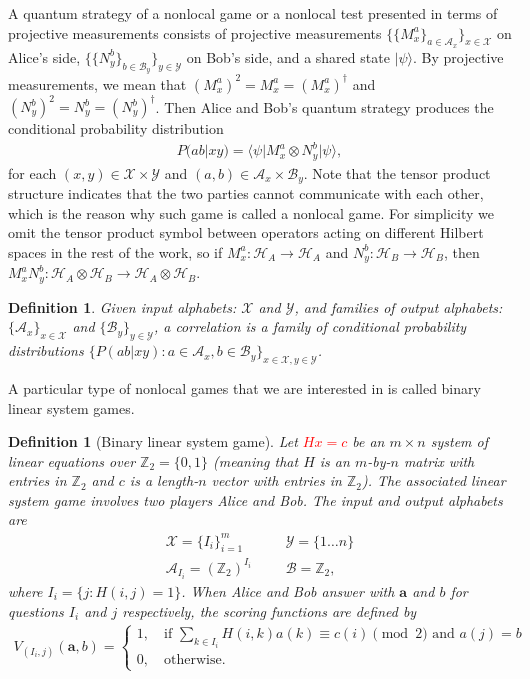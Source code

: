 \documentclass[11pt,letterpaper]{article}
\newcommand{\ket}[1]{|#1\rangle}
\newcommand{\bra}[1]{\langle#1|}
\newcommand{\x}{\otimes}
\newcommand{\Z}{\mathbb{Z}}
\newcommand{\calH}{\mathcal{H}}
\newcommand{\calX}{\mathcal{X}}
\newcommand{\calY}{\mathcal{Y}}
\newcommand{\calA}{\mathcal{A}}
\newcommand{\calB}{\mathcal{B}}
\newcommand{\1}{\mathbb{1}}
\newcommand{\ba}{\pmb{a}}
\newcommand{\pr}[2]{P(#1|#2)}
\newcommand{\hf}[1]{\textcolor{red}{#1}}
\newtheorem{definition}[theorem]{Definition}
\theoremstyle{definition}
\begin{document}
A quantum strategy of a nonlocal game or a nonlocal test presented in terms of projective measurements
consists of projective measurements $\{\{M_x^a\}_{a \in \calA_x} \}_{x \in \calX}$ on Alice's side, 
$\{\{N_y^b\}_{b \in \calB_y} \}_{y \in \calY}$ on Bob's side, and a shared state $\ket{\psi}$. 
By projective measurements, we mean that  
$(M_x^a)^2 = M_x^a = (M_x^a)^\dagger$ and $(N_y^b)^2 = N_y^b = (N_y^b)^\dagger$.
Then Alice and Bob's quantum strategy produces the conditional probability distribution
\begin{align}
	\pr{ab}{xy} = \bra{\psi} M_x^a \x N_y^b \ket{\psi},
\end{align}
for each $(x,y) \in \calX \times \calY$ and $(a,b) \in \calA_x \times \calB_y$.
Note that the tensor product structure indicates that the
two parties cannot communicate with each other, which is the reason why such game is called a nonlocal game.
For simplicity we omit the tensor product symbol between operators acting on different Hilbert spaces in the rest of the work, so if $M_x^a : \calH_A \rightarrow \calH_A$ and $N_y^b: 
\calH_B \rightarrow \calH_B$, then $M_x^a N_y^b: \calH_A\x \calH_B \rightarrow \calH_A \x \calH_B$.
\begin{definition}
	Given input alphabets: $\calX$ and $\calY$, and families of output
	alphabets: $\{\calA_x\}_{x \in \calX}$ and $\{\calB_y\}_{y \in \calY}$, a correlation is a family of conditional probability distributions
	$\{\pr{ab}{xy}: a \in \calA_x, b \in \calB_y\}_{x \in \calX, y \in \calY}$.  
\end{definition}
A particular type of nonlocal games that we are interested in is called binary linear system games.
\begin{definition}[Binary linear system game]
 Let \hf{$Hx = c$} be an $m \times n$ system of linear equations over $\Z_2 = \{0, 1\}$ (meaning that $H$ is an $m$-by-$n$ matrix with entries in $\Z_2$ and 
 $c$ is a length-$n$ vector with entries in $\Z_2$). 
 The associated linear system game involves two
 players Alice and Bob. 
 The input and output alphabets are 
 \begin{align*}
     \calX = \{I_i\}_{i=1}^m && &\calY = \{1 \dots n\} \\
     \calA_{I_i} = (\Z_2)^{I_i} && &\calB = \Z_2,
 \end{align*}
 where $I_i = \{j : H(i,j) = 1\}$.
 When Alice and Bob answer with $\ba$ and $b$ for questions $I_i$ and
 $j$ respectively,
 the scoring functions are defined by
 \begin{align}
 	V_{(I_i,j)}(\ba, b) =
	\begin{cases}
		1, \quad \text{if } \sum_{k \in I_i} H(i,k) a(k) \equiv c(i) \pmod 2 \text{ and } a(j) = b \\
		0,  \quad \text{otherwise.}
	\end{cases}
\end{align}
\end{definition}
\end{document}
